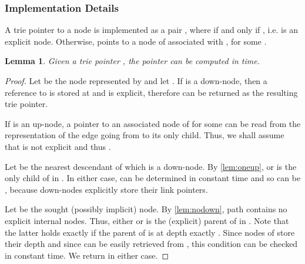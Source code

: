 \documentclass[a4paper]{article}
\newtheorem{lemma}[theorem]{Lemma}
\theoremstyle{remark}
\begin{document}
\subsubsection{Implementation Details}

A trie pointer  to a node  is implemented as a pair ,
where  if and only if , i.e.  is an explicit node.
Otherwise,  points to a node of  associated with , for some .

\begin{lemma}\label{lem:link}
Given a trie pointer , the pointer 
can be computed in  time.
\end{lemma}
\begin{proof}
Let  be the node represented by  and let .
If  is a down-node, then a reference to  is stored at  and  is explicit, therefore  can be returned as the resulting trie pointer.

If  is an up-node, a pointer  to an associated node of  for some 
can be read from the representation of the edge going from  to its only child.
Thus, we shall assume that  is not explicit and thus .

Let  be the nearest descendant of  which is a down-node.
By \cref{lem:oneup},  or  is the only child of  in .
In either case,  can be determined in constant time and so can be ,
because down-nodes explicitly store their link pointers.

Let  be the sought (possibly implicit) node.
By \cref{lem:nodown},  path contains no explicit internal nodes.
Thus, either  or  is the (explicit) parent of  in .
Note that the latter holds exactly if the parent of  is at depth exactly .
Since nodes of  store their depth and since  can be easily retrieved from ,
this condition can be checked in constant time. We return  in either case.
\end{proof}
\end{document}
